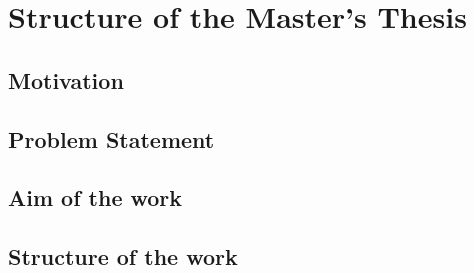 \section{Structure of the Master's Thesis}

\subsection{Motivation}

\subsection{Problem Statement}

\subsection{Aim of the work}

\subsection{Structure of the work}




